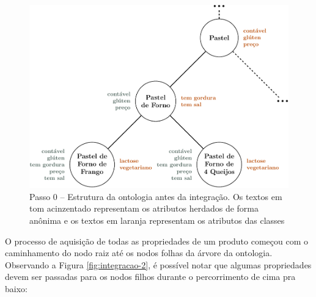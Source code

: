 \begin{figure}[H]
		\centering
		\caption[Integração da Ontologia -- Passo 0]{Passo 0 -- Estrutura da ontologia antes da integração. Os textos em tom acinzentado representam os atributos herdados de forma anônima e os textos em laranja representam os atributos das classes}
		\label{fig:integracao-1}
		\includegraphics[width=0.6\linewidth]{./pdf/tikz/toptop-1.pdf}
\end{figure}

O processo de aquisição de todas as propriedades de um produto começou com o caminhamento do nodo raiz até os nodos folhas da árvore da ontologia. Observando a Figura \ref{fig:integracao-2}, é possível notar que algumas propriedades devem ser passadas para os nodos filhos durante o percorrimento de cima pra baixo:

